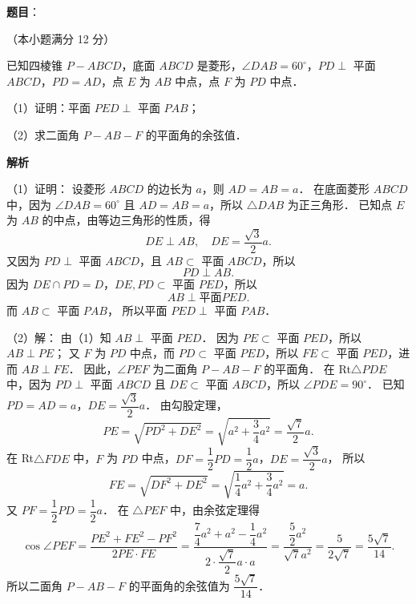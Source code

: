 \begin{answer}

\textbf{题目}：

（本小题满分 12 分）

已知四棱锥 $P - ABCD$，底面 $ABCD$ 是菱形，$\angle DAB = 60^\circ$，$PD \perp$ 平面 $ABCD$，$PD = AD$，点 $E$ 为 $AB$ 中点，点 $F$ 为 $PD$ 中点．

（1）证明：平面 $PED \perp$ 平面 $PAB$；

（2）求二面角 $P - AB - F$ 的平面角的余弦值．
\nopagebreak[4]
\begin{center}\end{center}
\nopagebreak[4]
\textbf{解析}
\nopagebreak[4]
\begin{center}\end{center}
\nopagebreak[4]
（1）证明：
设菱形 $ABCD$ 的边长为 $a$，则 $AD = AB = a$．
在底面菱形 $ABCD$ 中，因为 $\angle DAB = 60^\circ$ 且 $AD = AB = a$，所以 $\triangle DAB$ 为正三角形．
已知点 $E$ 为 $AB$ 的中点，由等边三角形的性质，得
\nopagebreak[4]
\[
DE \perp AB, \quad DE = \frac{\sqrt{3}}{2}a.
\]
又因为 $PD \perp$ 平面 $ABCD$，且 $AB \subset$ 平面 $ABCD$，所以
\nopagebreak[4]
\[
PD \perp AB.
\]
因为 $DE \cap PD = D$，$DE, PD \subset$ 平面 $PED$，所以
\nopagebreak[4]
\[
AB \perp \text{平面} PED.
\]
而 $AB \subset$ 平面 $PAB$，
所以平面 $PED \perp$ 平面 $PAB$．

（2）解：
由（1）知 $AB \perp$ 平面 $PED$．
因为 $PE \subset$ 平面 $PED$，所以 $AB \perp PE$；
又 $F$ 为 $PD$ 中点，而 $PD \subset$ 平面 $PED$，所以 $FE \subset$ 平面 $PED$，进而 $AB \perp FE$．
因此，$\angle PEF$ 为二面角 $P - AB - F$ 的平面角．
在 Rt$\triangle PDE$ 中，因为 $PD \perp$ 平面 $ABCD$ 且 $DE \subset$ 平面 $ABCD$，所以 $\angle PDE = 90^\circ$．
已知 $PD = AD = a$，$DE = \dfrac{\sqrt{3}}{2}a$．
由勾股定理，
\nopagebreak[4]
\[
PE = \sqrt{PD^2 + DE^2} = \sqrt{a^2 + \frac{3}{4}a^2} = \frac{\sqrt{7}}{2}a.
\]
在 Rt$\triangle FDE$ 中，$F$ 为 $PD$ 中点，$DF = \dfrac{1}{2}PD = \dfrac{1}{2}a$，$DE = \dfrac{\sqrt{3}}{2}a$，
所以
\nopagebreak[4]
\[
FE = \sqrt{DF^2 + DE^2} = \sqrt{\frac{1}{4}a^2 + \frac{3}{4}a^2} = a.
\]
又 $PF = \dfrac{1}{2}PD = \dfrac{1}{2}a$．
在 $\triangle PEF$ 中，由余弦定理得
\nopagebreak[4]
\[
\cos\angle PEF = \frac{PE^2 + FE^2 - PF^2}{2 PE \cdot FE} = \frac{\dfrac{7}{4}a^2 + a^2 - \dfrac{1}{4}a^2}{2 \cdot \dfrac{\sqrt{7}}{2}a \cdot a} = \frac{\dfrac{5}{2}a^2}{\sqrt{7}a^2} = \frac{5}{2\sqrt{7}} = \frac{5\sqrt{7}}{14}.
\]
所以二面角 $P - AB - F$ 的平面角的余弦值为 $\dfrac{5\sqrt{7}}{14}$．


\end{answer}
